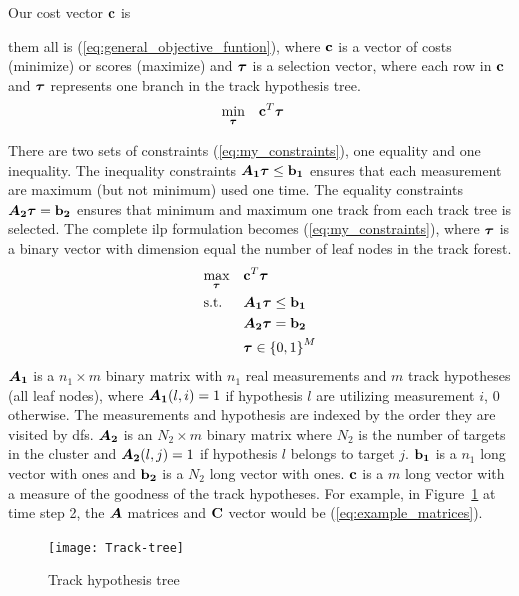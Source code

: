 
Our cost vector \(\boldsymbol{\mathbf{c}}\) is 

 them all is (\ref{eq:general_objective_funtion}), where \(\boldsymbol{\mathbf{c}}\) is a vector of costs (minimize) or scores (maximize) and \(\boldsymbol{\mathbf{\tau}}\) is a selection vector, where each row in \(\boldsymbol{\mathbf{c}}\) and \(\boldsymbol{\mathbf{\tau}}\) represents one branch in the track hypothesis tree.
\begin{equation}
\begin{aligned}
& \underset{\boldsymbol{\mathbf{\tau}}}{\text{min}}
& & \boldsymbol{\mathbf{c}}^T \boldsymbol{\mathbf{\tau}}
\end{aligned}
\label{eq:general_objective_funtion}
\end{equation}

There are two sets of constraints (\ref{eq:my_constraints}), one equality and one inequality. The inequality constraints \(\bm{A_1} \boldsymbol{\mathbf{\tau}} \leq \boldsymbol{\mathbf{b_1}}\) ensures that each measurement are maximum (but not minimum) used one time. The equality constraints \(\bm{A_2} \boldsymbol{\mathbf{\tau}} = \boldsymbol{\mathbf{b_2}}\) ensures that minimum and maximum one track from each track tree is selected. The complete \gls{ilp} formulation becomes (\ref{eq:my_constraints}), where \(\boldsymbol{\mathbf{\tau}}\) is a binary vector with dimension equal the number of leaf nodes in the track forest.
\begin{equation}
\begin{aligned}
&	\underset{\boldsymbol{\mathbf{\tau}}}{\text{max}}
&&	\boldsymbol{\mathbf{c}}^T \boldsymbol{\mathbf{\tau}} \\
&	\text{s.t.}
&&	\bm{A_1} \boldsymbol{\mathbf{\tau}} \leq \boldsymbol{\mathbf{b_1}} 	\\
&&&	\bm{A_2} \boldsymbol{\mathbf{\tau}} = \boldsymbol{\mathbf{b_2}}	\\
&&&	\boldsymbol{\mathbf{\tau}} \in {\{0,1\}}^{M}
\end{aligned}
\label{eq:my_constraints}
\end{equation}
\(\bm{A_1}\) is a \(n_1 \times m\) binary matrix with \(n_1\) real measurements and \(m\) track hypotheses (all leaf nodes), where \(\bm{A_1}(l,i)=1\) if hypothesis \(l\) are utilizing measurement \(i\), \(0\) otherwise. The measurements and hypothesis are indexed by the order they are visited by \gls{dfs}. \(\bm{A_2}\) is an \(N_2 \times m\) binary matrix where \(N_2\) is the number of targets in the cluster and \(\bm{A_2}(l,j)=1\) if hypothesis \(l\) belongs to target \(j\). \(\boldsymbol{\mathbf{b_1}}\) is a \(n_1\) long vector with ones and \(\boldsymbol{\mathbf{b_2}}\) is a \(N_2\) long vector with ones. \(\boldsymbol{\mathbf{c}}\) is a \(m\) long vector with a measure of the goodness of the track hypotheses. For example, in Figure~\ref{fig:hyp-tree} at time step 2, the \(\bm{A}\) matrices and \(\boldsymbol{\mathbf{C}}\) vector would be (\ref{eq:example_matrices}).
\begin{figure}[H]
\centering
\texttt{[image: Track-tree]}
\caption{Track hypothesis tree}\label{fig:hyp-tree}
\end{figure}

